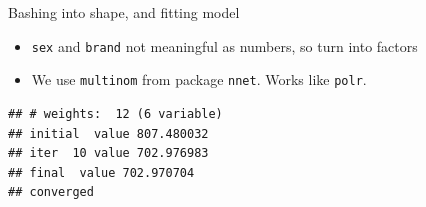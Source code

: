 \begin{frame}[fragile]{Bashing into shape, and fitting model}

  \begin{itemize}
  \item \texttt{sex} and \texttt{brand} not meaningful as numbers, so
    turn into factors
 
\begin{knitrout}
\color{fgcolor}\begin{kframe}
\begin{alltt}
\hlopt{$}\hlkwb{=}\hlopt{$}
\hlopt{$}\hlkwb{=}\hlopt{$}
\end{alltt}
\end{kframe}
\end{knitrout}
    
  \item We use \texttt{multinom} from package \texttt{nnet}. Works
    like \texttt{polr}.
  \end{itemize}

 
\begin{knitrout}
\color{fgcolor}\begin{kframe}
\begin{alltt}
\hlkwb{=}\hlopt{~}\hlopt{+}
\end{alltt}
\begin{verbatim}
## # weights:  12 (6 variable)
## initial  value 807.480032 
## iter  10 value 702.976983
## final  value 702.970704 
## converged
\end{verbatim}
\end{kframe}
\end{knitrout}
  
\end{frame}

